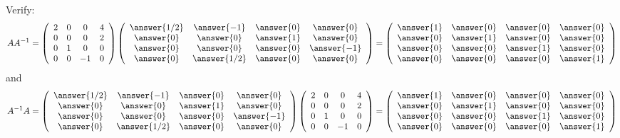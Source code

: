 \documentclass{ximera}
\begin{document}
\begin{exercise}
\begin{prompt}
Verify:
\[ A A^{-1} = \left(\begin{array}{cccc}
2 & 0 & 0 & 4\\
0 & 0 &0& 2\\
0& 1 & 0 & 0\\
0 & 0 & -1 & 0
\end{array}\right)\left(\begin{array}{cccc}
\answer{1/2} & \answer{-1} &\answer{0} & \answer{0}\\
 \answer{0} & \answer{0} &\answer{1} & \answer{0}\\
 \answer{0} & \answer{0} &\answer{0} & \answer{-1}\\
 \answer{0} & \answer{1/2} &\answer{0} & \answer{0}
\end{array}\right)= \left(\begin{array}{cccc}
\answer{1} & \answer{0} &\answer{0} & \answer{0}\\
 \answer{0} & \answer{1} &\answer{0} & \answer{0}\\
 \answer{0} & \answer{0} &\answer{1} & \answer{0}\\
 \answer{0} & \answer{0} &\answer{0} & \answer{1}
\end{array}\right)
\]
and
\[A^{-1}A=
\left(\begin{array}{cccc}
\answer{1/2} & \answer{-1} &\answer{0} & \answer{0}\\
 \answer{0} & \answer{0} &\answer{1} & \answer{0}\\
 \answer{0} & \answer{0} &\answer{0} & \answer{-1}\\
 \answer{0} & \answer{1/2} &\answer{0} & \answer{0}
\end{array}\right)\left(\begin{array}{cccc}
2 & 0 & 0 & 4\\
0 & 0 &0& 2\\
0& 1 & 0 & 0\\
0 & 0 & -1 & 0
\end{array}\right)= \left(\begin{array}{cccc}
\answer{1} & \answer{0} &\answer{0} & \answer{0}\\
 \answer{0} & \answer{1} &\answer{0} & \answer{0}\\
 \answer{0} & \answer{0} &\answer{1} & \answer{0}\\
 \answer{0} & \answer{0} &\answer{0} & \answer{1}
\end{array}\right)
\]

\end{prompt}
\end{exercise}
\end{document}
